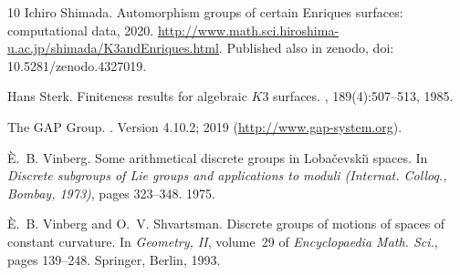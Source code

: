 \documentclass{amsart}
\numberwithin{procedure}{section}
\begin{document}
\begin{thebibliography}{10}
Ichiro Shimada.
\newblock Automorphism groups of certain {E}nriques surfaces: computational
  data, 2020.
\newblock
  \url{http://www.math.sci.hiroshima-u.ac.jp/shimada/K3andEnriques.html}.
Published also in zenodo, doi: 10.5281/zenodo.4327019.

Hans Sterk.
\newblock Finiteness results for algebraic {$K3$} surfaces.
, 189(4):507--513, 1985.

{The GAP Group}.
.
\newblock Version 4.10.2; 2019 (\url{http://www.gap-system.org}).

\`E.~B. Vinberg.
\newblock Some arithmetical discrete groups in {L}oba\v{c}evski\u{\i} spaces.
\newblock In {\em Discrete subgroups of {L}ie groups and applications to moduli
  ({I}nternat. {C}olloq., {B}ombay, 1973)}, pages 323--348. 1975.

\`E.~B. Vinberg and O.~V. Shvartsman.
\newblock Discrete groups of motions of spaces of constant curvature.
\newblock In {\em Geometry, {II}}, volume~29 of {\em Encyclopaedia Math. Sci.},
  pages 139--248. Springer, Berlin, 1993.

\end{thebibliography}



%
\end{document}
